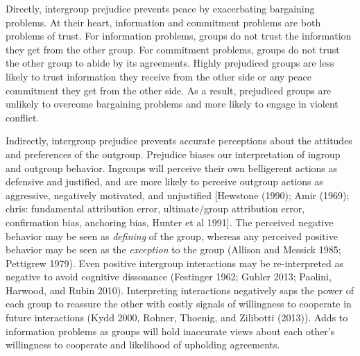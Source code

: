 \documentclass[11pt]{article}
\begin{document}
Directly, intergroup prejudice prevents peace by exacerbating bargaining
problems. At their heart, information and commitment problems are both
problems of trust. For information problems, groups do not trust the
information they get from the other group. For commitment problems,
groups do not trust the other group to abide by its agreements. Highly
prejudiced groups are less likely to trust information they receive from
the other side or any peace commitment they get from the other side. As
a result, prejudiced groups are unlikely to overcome bargaining problems
and more likely to engage in violent conflict.

Indirectly, intergroup prejudice prevents accurate perceptions about the
attitudes and preferences of the outgroup. Prejudice biases our
interpretation of ingroup and outgroup behavior. Ingroups will perceive
their own belligerent actions as defensive and justified, and are more
likely to perceive outgroup actions as aggressive, negatively motivated,
and unjustified {[}Hewstone (1990); Amir (1969); chris: fundamental
attribution error, ultimate/group attribution error, confirmation bias,
anchoring bias, Hunter et al 1991{]}. The perceived negative behavior
may be seen as \emph{defining} of the group, whereas any perceived
positive behavior may be seen as the \emph{exception} to the group
(Allison and Messick 1985; Pettigrew 1979). Even positive intergroup
interactions may be re-interpreted as negative to avoid cognitive
dissonance (Festinger 1962; Gubler 2013; Paolini, Harwood, and Rubin
2010). Interpreting interactions negatively saps the power of each group
to reassure the other with costly signals of willingness to cooperate in
future interactions (Kydd 2000, Rohner, Thoenig, and Zilibotti (2013)).
Adds to information problems as groups will hold inaccurate views about
each other's willingness to cooperate and likelihood of upholding
agreements.
\end{document}
